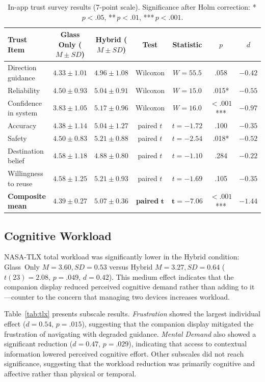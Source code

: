 \documentclass[review]{vgtc}           %
\begin{document}
\begin{table}[t]
  \centering
  \caption{In-app trust survey results (7-point scale). Significance after Holm correction: {*}\,$p < .05$, {**}\,$p < .01$, {***}\,$p < .001$.}
  \label{tab:trust}
  \small
  \begin{tabular}{lcccccc}
    \toprule
    Trust Item & Glass Only ($M \pm SD$) & Hybrid ($M \pm SD$) & Test & Statistic & $p$ & $d$ \\
    \midrule
    Direction guidance   & $4.33 \pm 1.01$ & $4.96 \pm 1.08$ & Wilcoxon & $W = 55.5$ & .058 & $-0.42$ \\
    Reliability          & $4.50 \pm 0.93$ & $5.04 \pm 0.91$ & Wilcoxon & $W = 15.0$ & .015{*} & $-0.55$ \\
    Confidence in system & $3.83 \pm 1.05$ & $5.17 \pm 0.96$ & Wilcoxon & $W = 16.0$ & ${<}.001${***} & $-0.97$ \\
    Accuracy             & $4.38 \pm 1.14$ & $5.04 \pm 1.27$ & paired $t$ & $t = -1.72$ & .100 & $-0.35$ \\
    Safety               & $4.50 \pm 0.83$ & $5.21 \pm 0.88$ & paired $t$ & $t = -2.54$ & .018{*} & $-0.52$ \\
    Destination belief   & $4.58 \pm 1.18$ & $4.88 \pm 0.80$ & paired $t$ & $t = -1.10$ & .284 & $-0.22$ \\
    Willingness to reuse & $4.58 \pm 1.25$ & $5.21 \pm 0.93$ & paired $t$ & $t = -1.69$ & .105 & $-0.35$ \\
    \midrule
    \textbf{Composite mean} & $\mathbf{4.39 \pm 0.27}$ & $\mathbf{5.07 \pm 0.36}$ & \textbf{paired} $\boldsymbol{t}$ & $\boldsymbol{t = -7.06}$ & $\boldsymbol{< .001}${***} & $\boldsymbol{-1.44}$ \\
    \bottomrule
  \end{tabular}
\end{table}

\subsection{Cognitive Workload}

NASA-TLX total workload was significantly lower in the Hybrid
condition: Glass~Only $M = 3.60, SD = 0.53$ versus Hybrid
$M = 3.27, SD = 0.64$ ($t(23) = 2.08$, $p = .049$, $d = 0.42$).
This medium effect indicates that the companion display reduced
perceived cognitive demand rather than adding to it---counter to the
concern that managing two devices increases workload.

Table~\ref{tab:tlx} presents subscale results. \emph{Frustration}
showed the largest individual effect ($d = 0.54$, $p = .015$),
suggesting that the companion display mitigated the frustration
of navigating with degraded guidance. \emph{Mental Demand} also
showed a significant reduction ($d = 0.47$, $p = .029$), indicating
that access to contextual information lowered perceived cognitive
effort. Other subscales did not reach significance, suggesting that
the workload reduction was primarily cognitive and affective rather
than physical or temporal.
\end{document}
